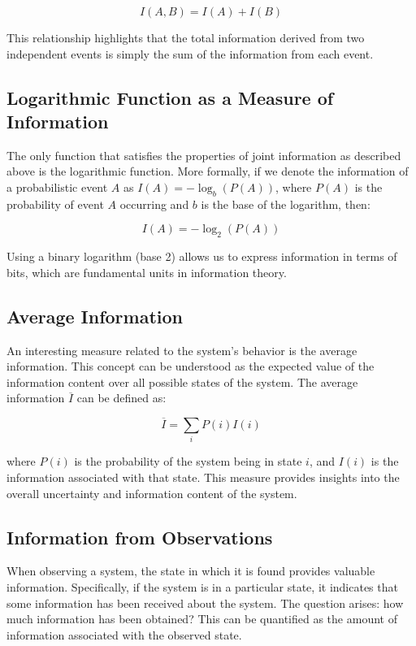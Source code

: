 \documentclass[a4paper]{article}
\begin{document}
\begin{equation}
I(A, B) = I(A) + I(B)
\end{equation}

This relationship highlights that the total information derived from two independent events is simply the sum of the information from each event.

\subsection{Logarithmic Function as a Measure of Information}
The only function that satisfies the properties of joint information as described above is the logarithmic function. More formally, if we denote the information of a probabilistic event \( A \) as \( I(A) = -\log_b(P(A)) \), where \( P(A) \) is the probability of event \( A \) occurring and \( b \) is the base of the logarithm, then:

\begin{equation}
I(A) = -\log_2(P(A))
\end{equation}

Using a binary logarithm (base 2) allows us to express information in terms of bits, which are fundamental units in information theory.

\subsection{Average Information}
An interesting measure related to the system's behavior is the average information. This concept can be understood as the expected value of the information content over all possible states of the system. The average information \( \overline{I} \) can be defined as:

\begin{equation}
\overline{I} = \sum_{i} P(i) I(i)
\end{equation}

where \( P(i) \) is the probability of the system being in state \( i \), and \( I(i) \) is the information associated with that state. This measure provides insights into the overall uncertainty and information content of the system.

\subsection{Information from Observations}
When observing a system, the state in which it is found provides valuable information. Specifically, if the system is in a particular state, it indicates that some information has been received about the system. The question arises: how much information has been obtained? This can be quantified as the amount of information associated with the observed state.
\end{document}
